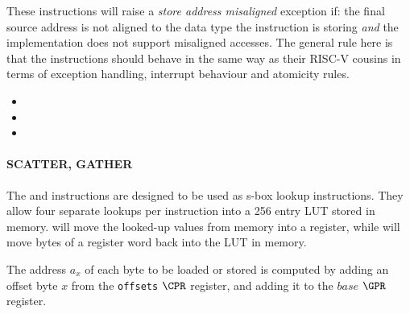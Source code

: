 These instructions will raise a {\em store address misaligned} exception
if: the final source address is not aligned to the data type the instruction
is storing {\em and} the implementation does not support misaligned accesses.
The general rule here is that the  instructions should behave in
the same way as their RISC-V cousins in terms of exception handling,
interrupt behaviour and atomicity rules.

\begin{itemize}
\item {}
\item {}
\item {}
\end{itemize}


\paragraph{SCATTER, GATHER}

The  and  instructions are designed to be used as
s-box lookup instructions. They allow four separate lookups per instruction
into a 256 entry LUT stored in memory.  will move the looked-up
values from memory into a register, while  will move bytes of a
register word back into the LUT in memory.

The address $a_x$ of each byte to be loaded or stored is computed by
adding an offset byte $x$ from the {\tt offsets} $\CPR$ register, and
adding it to the $base$ $\GPR$ register.


